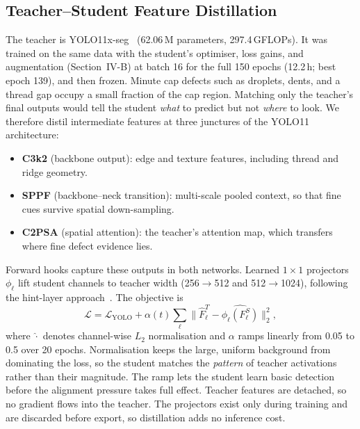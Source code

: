 \documentclass[conference]{IEEEtran}
\begin{document}
\subsection{Teacher--Student Feature Distillation}
\label{sec:kd}
The teacher is YOLO11x-seg~\cite{yolo11} (62.06\,M parameters, 297.4\,GFLOPs). It was trained on the same data with the student's optimiser, loss gains, and augmentation (Section~IV-B) at batch 16 for the full 150 epochs (12.2\,h; best epoch 139), and then frozen. Minute cap defects such as droplets, dents, and a thread gap occupy a small fraction of the cap region. Matching only the teacher's final outputs would tell the student \emph{what} to predict but not \emph{where} to look. We therefore distil intermediate features at three junctures of the YOLO11 architecture:
\begin{itemize}
\item \textbf{C3k2} (backbone output): edge and texture features, including thread and ridge geometry.
\item \textbf{SPPF} (backbone--neck transition): multi-scale pooled context, so that fine cues survive spatial down-sampling.
\item \textbf{C2PSA} (spatial attention): the teacher's attention map, which transfers where fine defect evidence lies.
\end{itemize}
Forward hooks capture these outputs in both networks. Learned $1{\times}1$ projectors $\phi_\ell$ lift student channels to teacher width (256$\to$512 and 512$\to$1024), following the hint-layer approach~\cite{romero2015}. The objective is
\begin{equation}
\mathcal{L}=\mathcal{L}_{\mathrm{YOLO}}+\alpha(t)\sum_{\ell}\bigl\lVert \hat F^{T}_{\ell}-\widehat{\phi_\ell(F^{S}_{\ell})}\bigr\rVert_2^2,
\end{equation}
where $\hat{\cdot}$ denotes channel-wise $L_2$ normalisation and $\alpha$ ramps linearly from 0.05 to 0.5 over 20 epochs. Normalisation keeps the large, uniform background from dominating the loss, so the student matches the \emph{pattern} of teacher activations rather than their magnitude. The ramp lets the student learn basic detection before the alignment pressure takes full effect. Teacher features are detached, so no gradient flows into the teacher. The projectors exist only during training and are discarded before export, so distillation adds no inference cost.
\end{document}
